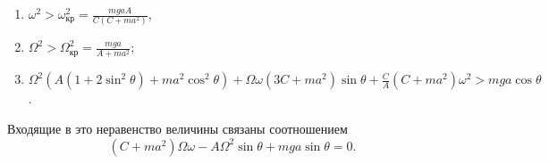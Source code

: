 \begin{enumerate}
	\item $\omega ^2 > \omega ^2_{\mbox{кр}} = \frac{mgaA}{C(C + ma^2)}$,
	\item $\Omega ^2 > \Omega ^2_{\mbox{кр}} = \frac{mga}{A + ma^2}$;
	\item $\Omega ^2\left( A(1 + 2\sin^2{\theta}) +
	ma^2\cos^2{\theta}\right)+
	\Omega\omega(3C + ma^2)\sin{\theta} +
	\frac{C}{A}(C + ma^2)\omega ^2 > mga\cos{\theta}$.
\end{enumerate}
Входящие в это неравенство величины связаны соотношением
$$(C + ma^2)\Omega\omega - A\Omega ^2\sin{\theta}+
mga\sin{\theta} = 0.$$
